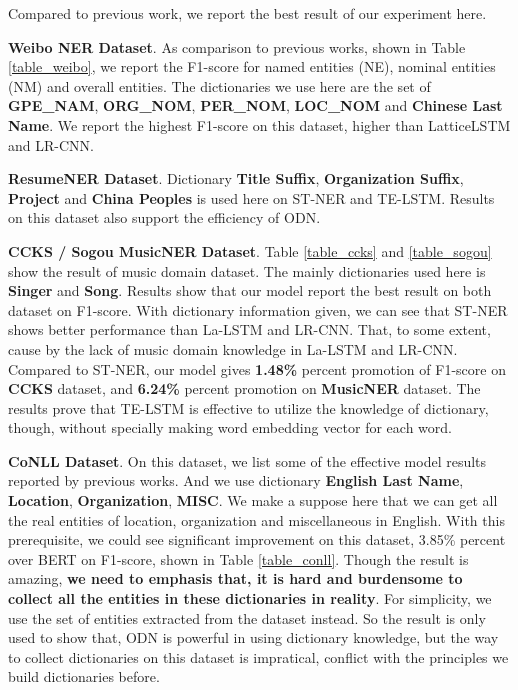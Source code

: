 \documentclass[letterpaper]{article} %
\begin{document}
Compared to previous work, we report the best result of our experiment here.

\textbf{Weibo NER Dataset}. As comparison to previous works, shown in Table \ref{table_weibo}, we report the F1-score for named entities (NE), nominal  entities (NM) and overall entities. The dictionaries we use here are the set of \textbf{GPE\_NAM}, \textbf{ORG\_NOM}, \textbf{PER\_NOM}, \textbf{LOC\_NOM} and \textbf{Chinese Last Name}. We report the highest F1-score on this dataset, higher than LatticeLSTM and LR-CNN.

\textbf{ResumeNER Dataset}. Dictionary \textbf{Title Suffix}, \textbf{Organization Suffix}, \textbf{Project} and \textbf{China Peoples} is used here on ST-NER and TE-LSTM. Results on this dataset also support the efficiency of ODN.

\textbf{CCKS / Sogou MusicNER Dataset}. Table \ref{table_ccks} and \ref{table_sogou} show the result of music domain dataset. The mainly dictionaries used here is \textbf{Singer} and \textbf{Song}. Results show that our model report the best result on both dataset on F1-score. With dictionary information given, we can see that ST-NER shows better performance than La-LSTM and LR-CNN. That, to some extent, cause by the lack of music domain knowledge in La-LSTM and LR-CNN. Compared to ST-NER, our model gives \textbf{1.48\%} percent promotion of F1-score on \textbf{CCKS} dataset, and \textbf{6.24\%} percent promotion on \textbf{MusicNER} dataset. The results prove that TE-LSTM is effective to utilize the knowledge of dictionary, though, without specially making word embedding vector for each word.

\textbf{CoNLL Dataset}. On this dataset, we list some of the effective model results reported by previous works. And we use dictionary \textbf{English Last Name}, \textbf{Location}, \textbf{Organization}, \textbf{MISC}. We make a suppose here that we can get all the real entities of location, organization and miscellaneous in English. With this prerequisite, we could see significant improvement on this dataset, 3.85\% percent over BERT \cite{bert} on F1-score, shown in Table \ref{table_conll}. Though the result is amazing, \textbf{we need to emphasis that, it is hard and burdensome to collect all the entities in these dictionaries in reality}. For simplicity, we use the set of entities extracted from the dataset instead. So the result is only used to show that, ODN is powerful in using dictionary knowledge, but the way to collect dictionaries on this dataset is impratical, conflict with the principles we build dictionaries before.
\end{document}
